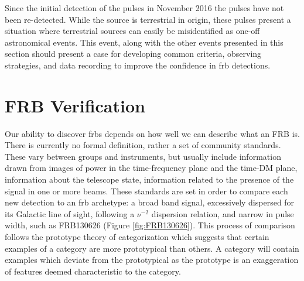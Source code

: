 \documentclass[a4paper,fleqn,usenatbib]{mnras}
\begin{document}
Since the initial detection of the pulses in November 2016 the pulses have not
been re-detected. While the source is terrestrial in origin, these pulses
present a situation where terrestrial sources can easily be misidentified as
one-off astronomical events. This event, along with the other events presented
in this section should present a case for developing common criteria, observing
strategies, and data recording to improve the confidence in \gls{frb}
detections.

\section{FRB Verification}
\label{sec:verify_crit}

Our ability to discover \glspl{frb} depends on how well we can describe what an
FRB is. There is currently no formal definition, rather a set of community
standards. These vary between groups and instruments, but usually include
information drawn from images of power in the time-frequency plane and the
time-DM plane, information about the telescope state, information related to the
presence of the signal in one or more beams.  These standards are set in order
to compare each new detection to an \gls{frb} archetype: a broad band signal,
excessively dispersed for its Galactic line of sight, following a $\nu^{-2}$
dispersion relation, and narrow in pulse width, such as FRB130626
\citep{2016MNRAS.460L..30C} (Figure \ref{fig:FRB130626}). This process of
comparison follows the prototype theory of categorization \citep{ROSCH1976382}
which suggests that certain examples of a category are more prototypical than
others. A category will contain examples which deviate from the prototypical as
the prototype is an exaggeration of features deemed characteristic to the
category.
\end{document}
